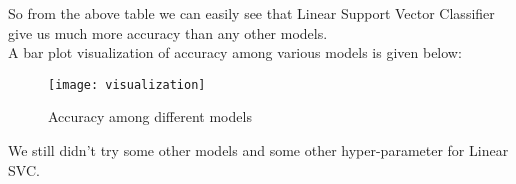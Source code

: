 So from the above table we can easily see that Linear Support Vector Classifier give us much more accuracy than any other models.\\
\newpage
A bar plot visualization of accuracy among various models is given below:


\begin{figure}[ht]
    \centering
    \texttt{[image: visualization]}
    \caption{Accuracy among different models}
\end{figure}
\vline




We still didn't try some other models and some other hyper-parameter for Linear SVC.
\newpage
	
	
